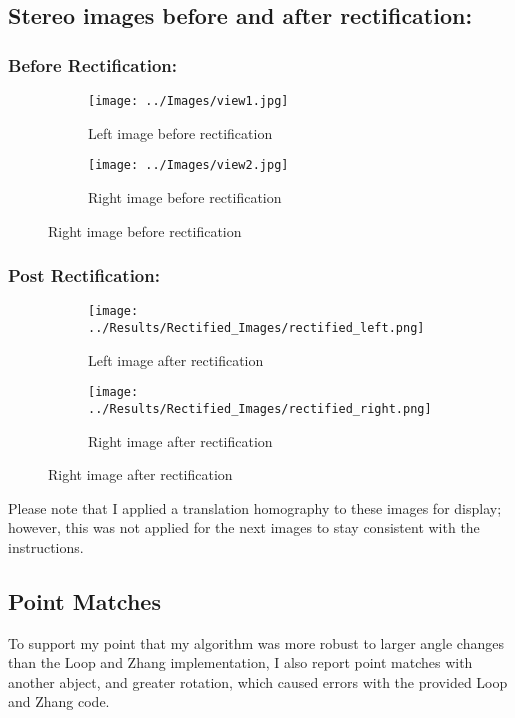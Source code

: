 \documentclass{article}
\begin{document}
\subsection{Stereo images before and after rectification:}
\subsubsection{Before Rectification:}
\begin{figure}[H]
    \centering
    \begin{subfigure}{0.49\linewidth}
        \centering
        \texttt{[image: ../Images/view1.jpg]}
        \caption{Left image before rectification}
    \end{subfigure}
    \begin{subfigure}{0.49\linewidth}
        \centering
        \texttt{[image: ../Images/view2.jpg]}
        \caption{Right image before rectification}
    \end{subfigure}
\end{figure}

\subsubsection{Post Rectification:}
\begin{figure}[H]
    \centering
    \begin{subfigure}{0.49\linewidth}
        \centering
        \texttt{[image: ../Results/Rectified\_Images/rectified\_left.png]}
        \caption{Left image after rectification}
    \end{subfigure}
    \begin{subfigure}{0.49\linewidth}
        \centering
        \texttt{[image: ../Results/Rectified\_Images/rectified\_right.png]}
        \caption{Right image after rectification}
    \end{subfigure}
\end{figure}
Please note that I applied a translation homography to these images for display; however, this was not applied for the next images to stay consistent with the instructions.

\subsection{Point Matches}
To support my point that my algorithm was more robust to larger angle changes than the Loop and Zhang implementation, I also report point matches with another abject, and greater rotation, which caused errors with the provided Loop and Zhang code.
\end{document}
